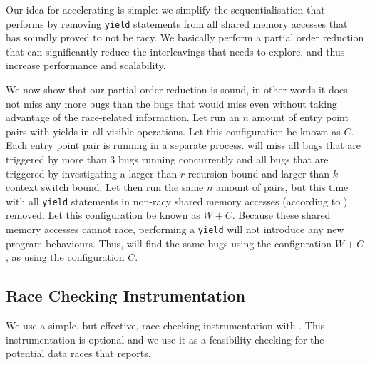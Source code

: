 Our idea for accelerating \corral is simple: we simplify the sequentialisation that \corral performs by removing \texttt{yield} statements from all shared memory accesses that \whoop has soundly proved to not be racy. We basically perform a partial order reduction that can significantly reduce the interleavings that \corral needs to explore, and thus increase performance and scalability.

We now show that our partial order reduction is sound, in other words it does not miss any more bugs than the bugs that \corral would miss even without taking advantage of the \whoop race-related information. Let \corral run an $n$ amount of entry point pairs with yields in all visible operations. Let this configuration be known as $C$. Each entry point pair is running in a separate \corral process. \corral will miss all bugs that are triggered by more than 3 bugs running concurrently and all bugs that are triggered by investigating a larger than $r$ recursion bound and larger than $k$ context switch bound. Let \corral then run the same $n$ amount of pairs, but this time with all \texttt{yield} statements in non-racy shared memory accesses (according to \whoop) removed. Let this configuration be known as $W+C$. Because these shared memory accesses cannot race, performing a \texttt{yield} will not introduce any new program behaviours. Thus, \corral will find the same bugs using the configuration $W+C$, as using the configuration $C$.

\subsection{Race Checking Instrumentation}
\label{bf:racechecking}

We use a simple, but effective, race checking instrumentation with \corral. This instrumentation is optional and we use it as a feasibility checking for the potential data races that \whoop reports.